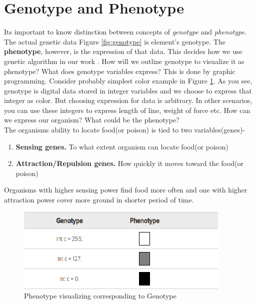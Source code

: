 \documentclass[conference]{IEEEtran}
\begin{document}
\section{Genotype and Phenotype}
Its important to know distinction between concepts of \textit{genotype} and \textit{phenotype}. The actual genetic data Figure \ref{fig:genotype} is element's genotype. The \textbf{phenotype}, however, is the expression of that data. This decides how we use genetic algorithm in our work \cite{mapping-genotype-phenotype}. How will we outline genotype to visualize it as phenotype? What does genotype variables express? This is done by graphic programming. Consider probably simplest color example in Figure \ref{fig:genotype-and-phenotype}. As you see, genotype is digital data stored in integer variables and we choose to express that integer as color. But choosing expression for data is arbitrary. In other scenarios, you can use these integers to express length of line, weight of force etc. How can we express our organism? What could be the phenotype?\\
The organisms ability to locate food(or poison) is tied to two variables(genes)-
\begin{enumerate}
\item \textbf{Sensing genes.} To what extent organism can locate food(or poison)
\item \textbf{Attraction/Repulsion genes.} How quickly it moves toward the food(or poison)
\end{enumerate}
Organisms with higher sensing power find food more often and one with higher attraction power cover more ground in shorter period of time.
\begin{figure}
	\includegraphics[scale=1]{genotype-and-phenotype.png}
	\caption{Phenotype visualizing corresponding to Genotype}
	\label{fig:genotype-and-phenotype}
\end{figure}
\end{document}
